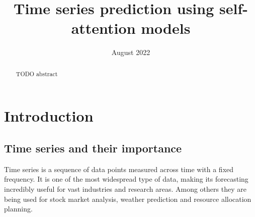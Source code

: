 \documentclass[en]{pracamgr}
\title{Time series prediction using self-attention models}
\date{August 2022}
\begin{document}
\maketitle

\begin{abstract}
  TODO abstract
\end{abstract}

\tableofcontents

\chapter{Introduction}
\section{Time series and their importance}\label{r:tsi}


Time series is a sequence of data points measured across time with a fixed frequency.
It is one of the most widespread type of data, making its forecasting incredibly useful for vast industries and research areas. Among others they are being used for stock market analysis, weather prediction and resource allocation planning.

\end{document}
